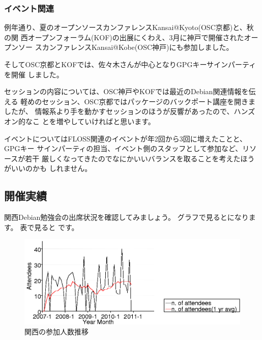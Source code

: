 \documentclass[mingoth,a4paper]{jsarticle}
\begin{document}
\subsubsection{イベント関連}

例年通り、夏のオープンソースカンファレンスKansai@Kyoto(OSC京都)と、秋の関
西オープンフォーラム(KOF)の出展にくわえ、3月に神戸で開催されたオープンソー
スカンファレンスKansai@Kobe(OSC神戸)にも参加しました。

そしてOSC京都とKOFでは、佐々木さんが中心となりGPGキーサインパーティを開催
しました。

セッションの内容については、OSC神戸やKOFでは最近のDebian関連情報を伝える
軽めのセッション、OSC京都ではパッケージのバックポート講座を開きましたが、
情報系より手を動かすセッションのほうが反響があったので、ハンズオン的なこ
とを増やしていければと思います。

イベントについてはFLOSS関連のイベントが年2回から3回に増えたことと、GPGキー
サインパーティの担当、イベント側のスタッフとして参加など、リソースが若干
厳しくなってきたのでなにかいいバランスを取ることを考えたほうがいいのかも
しれません。


\subsection{開催実績}

関西Debian勉強会の出席状況を確認してみましょう。
グラフで見るとになります。
表で見ると です。

\begin{figure}[h]
 \begin{center}
  \includegraphics[width=1\hsize]{image201012/memberanalysis/kansai.png}
 \end{center}
\caption{関西の参加人数推移}
\label{fig:kansaipeoplechart}
\end{figure}
\end{document}
